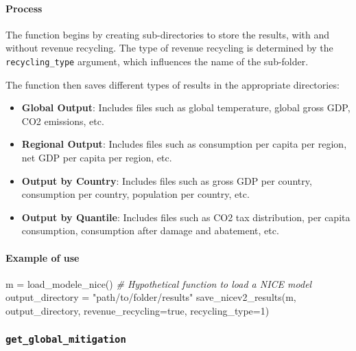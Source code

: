 \documentclass[
]{article}
\newenvironment{Shaded}{}{}
\newcommand{\CommentTok}[1]{\textcolor[rgb]{0.38,0.63,0.69}{\textit{#1}}}
\newcommand{\ConstantTok}[1]{\textcolor[rgb]{0.53,0.00,0.00}{#1}}
\newcommand{\FloatTok}[1]{\textcolor[rgb]{0.25,0.63,0.44}{#1}}
\newcommand{\FunctionTok}[1]{\textcolor[rgb]{0.02,0.16,0.49}{#1}}
\newcommand{\NormalTok}[1]{#1}
\newcommand{\OperatorTok}[1]{\textcolor[rgb]{0.40,0.40,0.40}{#1}}
\newcommand{\StringTok}[1]{\textcolor[rgb]{0.25,0.44,0.63}{#1}}
\providecommand{\tightlist}{%
  \setlength{\itemsep}{0pt}\setlength{\parskip}{0pt}}
\begin{document}
\paragraph{Process}\label{process-1}

The function begins by creating sub-directories to store the results,
with and without revenue recycling. The type of revenue recycling is
determined by the \texttt{recycling\_type} argument, which influences
the name of the sub-folder.

The function then saves different types of results in the appropriate
directories:

\begin{itemize}
\tightlist
\item
  \textbf{Global Output}: Includes files such as global temperature,
  global gross GDP, CO2 emissions, etc.
\item
  \textbf{Regional Output}: Includes files such as consumption per
  capita per region, net GDP per capita per region, etc.
\item
  \textbf{Output by Country}: Includes files such as gross GDP per
  country, consumption per country, population per country, etc.
\item
  \textbf{Output by Quantile}: Includes files such as CO2 tax
  distribution, per capita consumption, consumption after damage and
  abatement, etc.
\end{itemize}

\paragraph{Example of use}\label{example-of-use-2}

\begin{Shaded}
\begin{Highlighting}[]
\NormalTok{m }\OperatorTok{=} \FunctionTok{load\_modele\_nice}\NormalTok{() }\CommentTok{\# Hypothetical function to load a NICE model}
\NormalTok{output\_directory }\OperatorTok{=} \StringTok{"path/to/folder/results"}
\FunctionTok{save\_nicev2\_results}\NormalTok{(m, output\_directory, revenue\_recycling}\OperatorTok{=}\ConstantTok{true}\NormalTok{, recycling\_type}\OperatorTok{=}\FloatTok{1}\NormalTok{)}
\end{Highlighting}
\end{Shaded}

\subsubsection{\texorpdfstring{\texttt{get\_global\_mitigation}}{Get\_global\_mitigation}}\label{get_global_mitigation}
\end{document}

